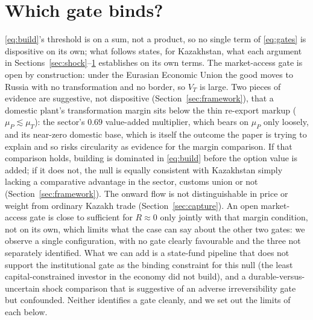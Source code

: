 \documentclass[12pt]{article}
\begin{document}
\section{Which gate binds?}\label{sec:why}

\eqref{eq:build}'s threshold is on a sum, not a product, so no single term of \eqref{eq:gates}
is dispositive on its own; what follows states, for Kazakhstan, what each argument in
Sections~\ref{sec:shock}--\ref{sec:why} establishes on its own terms. The market-access gate is open by construction: under the Eurasian Economic Union the good moves to Russia with no transformation and
no border, so $V_T$ is large. Two pieces of evidence are suggestive, not dispositive
(Section~\ref{sec:framework}), that a domestic plant's transformation margin sits below the
thin re-export markup ($\mu_P \lesssim \mu_T$): the sector's $0.69$ value-added multiplier,
which bears on $\mu_P$ only loosely, and its near-zero domestic base, which is itself the
outcome the paper is trying to explain and so risks circularity as evidence for the margin
comparison. If that comparison holds, building is dominated in \eqref{eq:build} before the
option value is added; if it does not, the null is equally consistent with Kazakhstan simply
lacking a comparative advantage in the sector, customs union or not
(Section~\ref{sec:framework}). The onward flow is not distinguishable in price or weight
from ordinary Kazakh trade (Section~\ref{sec:capture}). An open market-access gate is close to
sufficient for $R \approx 0$ only jointly with that margin condition, not on its own, which
limits what the case can say about the other two gates: we observe a single configuration,
with no gate clearly favourable and the three not separately identified. What we can add is a state-fund pipeline that does not support the institutional gate as the binding constraint for this null (the least
capital-constrained investor in the economy did not build), and a
durable-versus-uncertain shock comparison that is suggestive of an adverse
irreversibility gate but confounded. Neither identifies a gate cleanly, and we set out the
limits of each below.
\end{document}
